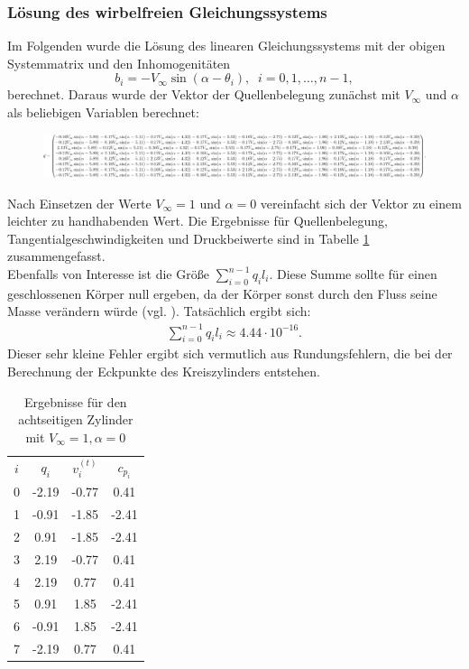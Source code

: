 \subsubsection{Lösung des wirbelfreien Gleichungssystems}
Im Folgenden wurde die Lösung des linearen Gleichungssystems mit der obigen Systemmatrix und den Inhomogenitäten
\begin{equation}
b_i =  -V_{\infty} \sin{(\alpha -\theta _i)}, \;\; i= 0,1,\ldots, n-1,
\end{equation}
berechnet. Daraus wurde der Vektor der Quellenbelegung zunächst mit $V_{\infty}$ und $\alpha $ als beliebigen Variablen berechnet: \\
\begin{figure}[!h]
\begin{center}
\includegraphics[scale=0.2]{figures/analytical.png} 
\label{fig:analyticalcylinder8}
\end{center}
\end{figure}

Nach Einsetzen der Werte $V_{\infty} = 1$ und $\alpha  = 0$ vereinfacht sich der Vektor zu einem leichter zu handhabenden Wert. Die Ergebnisse für Quellenbelegung, Tangentialgeschwindigkeiten und Druckbeiwerte sind in Tabelle \ref{tab:cyl8} zusammengefasst. \\
Ebenfalls von Interesse ist die Größe $\sum_{i=0}^{n-1} q_i l_i$. Diese Summe sollte für einen geschlossenen Körper null ergeben, da der Körper sonst durch den Fluss seine Masse verändern würde (vgl. \cite{Barba:2019}). Tatsächlich ergibt sich:
\begin{align*}
\sum_{i=0}^{n-1} q_i l_i \approx 4.44 \cdot 10^{-16}.
\end{align*}
Dieser sehr kleine Fehler ergibt sich vermutlich aus Rundungsfehlern, die bei der Berechnung der Eckpunkte des Kreiszylinders entstehen.

\begin{table}
\caption{Ergebnisse für den achtseitigen Zylinder mit $V_{\infty} = 1, \alpha  = 0$}
\label{tab:cyl8}
\begin{center}
\begin{tabular}{c|ccc}
$i$ & $q_i$ & $v_i^{(t)}$ & $c_{p_i}$ \\
0 & -2.19 & -0.77 & 0.41 \\
1 & -0.91 & -1.85 & -2.41 \\
2 & 0.91 & -1.85 & -2.41 \\
3 & 2.19 & -0.77 & 0.41 \\
4 & 2.19 & 0.77 &  0.41 \\ 
5 &  0.91 & 1.85 & -2.41 \\
6 & -0.91 & 1.85 & -2.41 \\
7 & -2.19 &0.77 & 0.41
\end{tabular}
\end{center}
\end{table}

